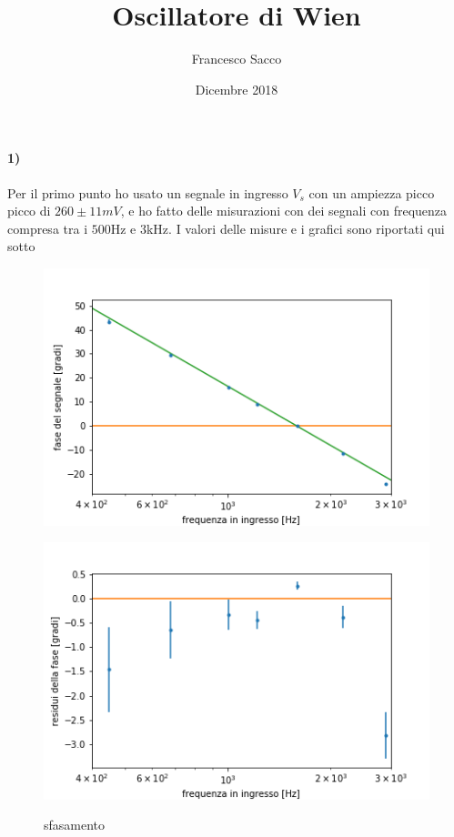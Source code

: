 \documentclass{article}
\date{Dicembre 2018}
\author{Francesco Sacco}
\title{Oscillatore di Wien}
\begin{document}
\maketitle
\paragraph{1)}
	Per il primo punto ho usato un segnale in ingresso $V_s$ con un ampiezza picco picco di $260\pm11 mV$, e ho fatto delle misurazioni con dei segnali con frequenza compresa tra i $500$Hz e $3$kHz. I valori delle misure e i grafici sono riportati qui sotto\newline
	\begin{center}
		
	\end{center}
	\begin{figure}[htb]
	    \begin{minipage}[t]{.5\linewidth}
	        \centering
	        \includegraphics[width=\linewidth]{figure/1.png}
			\label{fig:1}
	    \end{minipage}
	    \begin{minipage}[t]{.5\linewidth}
	        \centering
	        \includegraphics[width=\linewidth]{figure/1res.png}
			\label{fig:1res}
	    \end{minipage}
	    \caption{sfasamento}
	\end{figure}
\end{document}

